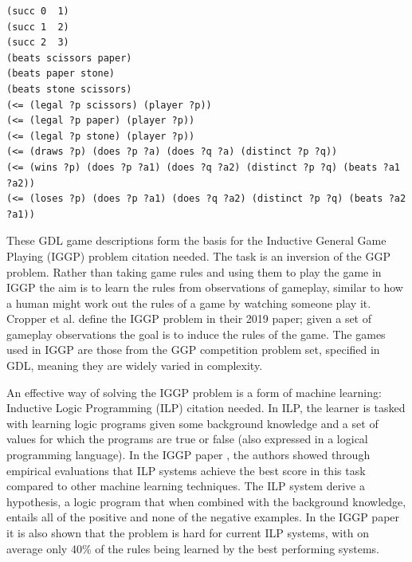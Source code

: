 \begin{listing}[ht]
\begin{verbatim}
(succ 0  1)
(succ 1  2)
(succ 2  3)
(beats scissors paper)
(beats paper stone)
(beats stone scissors)
(<= (legal ?p scissors) (player ?p))
(<= (legal ?p paper) (player ?p))
(<= (legal ?p stone) (player ?p))
(<= (draws ?p) (does ?p ?a) (does ?q ?a) (distinct ?p ?q))
(<= (wins ?p) (does ?p ?a1) (does ?q ?a2) (distinct ?p ?q) (beats ?a1 ?a2))
(<= (loses ?p) (does ?p ?a1) (does ?q ?a2) (distinct ?p ?q) (beats ?a2 ?a1))
\end{verbatim}
\caption{
\ac{is this listing referenced in the text?}
A sample of rules from the GDL description of Rock Paper Scissors. The $?$ indicates a variable and $<=$ indicates an implication with the first expression after being the head and the conjugation of the rest making up the body
}
\end{listing}


These GDL game descriptions form the basis for the Inductive General Game Playing (IGGP) problem \ac{citation needed}. The task is an inversion of the GGP problem. Rather than taking game rules and using them to play the game in IGGP the aim is to learn the rules from observations of gameplay, similar to how a human might work out the rules of a game by watching someone play it. Cropper et al. define the IGGP problem in their 2019 paper; given a set of gameplay observations the goal is to induce the rules of the game\cite{Cropper/IGGP}. The games used in IGGP are those from the GGP competition problem set, specified in GDL, meaning they are widely varied in complexity.


An effective way of solving the IGGP problem is a form of machine learning: Inductive Logic Programming (ILP) \ac{citation needed}. In ILP, the learner is tasked with learning logic programs given some background knowledge and a set of values for which the programs are true or false (also expressed in a logical programming language). In the IGGP paper \cite{Cropper/IGGP}, the authors showed through empirical evaluations that ILP systems achieve the best score in this task compared to other machine learning techniques. The ILP system derive a hypothesis, a logic program that when combined with the background knowledge, entails all of the positive and none of the negative examples\cite{Muggleton/ILP}. In the IGGP paper\cite{Cropper/IGGP} it is also shown that the problem is hard for current ILP systems, with on average only 40\% of the rules being learned by the best performing systems.

